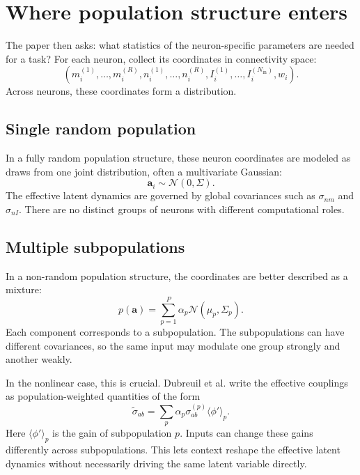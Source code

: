\documentclass[11pt]{article}
\begin{document}
\section{Where population structure enters}

The paper then asks: what statistics of the neuron-specific parameters are needed
for a task? For each neuron, collect its coordinates in connectivity space:
\begin{equation}
  \left(
    m_i^{(1)},\ldots,m_i^{(R)},
    n_i^{(1)},\ldots,n_i^{(R)},
    I_i^{(1)},\ldots,I_i^{(N_{\mathrm{in}})},
    w_i
  \right).
\end{equation}
Across neurons, these coordinates form a distribution.

\subsection*{Single random population}

In a fully random population structure, these neuron coordinates are modeled as
draws from one joint distribution, often a multivariate Gaussian:
\begin{equation}
  \mathbf{a}_i \sim \mathcal{N}(0,\Sigma).
\end{equation}
The effective latent dynamics are governed by global covariances such as
$\sigma_{nm}$ and $\sigma_{nI}$. There are no distinct groups of neurons with
different computational roles.

\subsection*{Multiple subpopulations}

In a non-random population structure, the coordinates are better described as a
mixture:
\begin{equation}
  p(\mathbf{a})
  =
  \sum_{p=1}^{P}
  \alpha_p \mathcal{N}(\mu_p,\Sigma_p).
\end{equation}
Each component corresponds to a subpopulation. The subpopulations can have
different covariances, so the same input may modulate one group strongly and
another weakly.

In the nonlinear case, this is crucial. Dubreuil et al. write the effective couplings
as population-weighted quantities of the form
\begin{equation}
  \widetilde{\sigma}_{ab}
  =
  \sum_p
  \alpha_p
  \sigma_{ab}^{(p)}
  \langle \phi' \rangle_p.
\end{equation}
Here $\langle \phi' \rangle_p$ is the gain of subpopulation $p$. Inputs can change
these gains differently across subpopulations. This lets context reshape the
effective latent dynamics without necessarily driving the same latent variable
directly.
\end{document}
